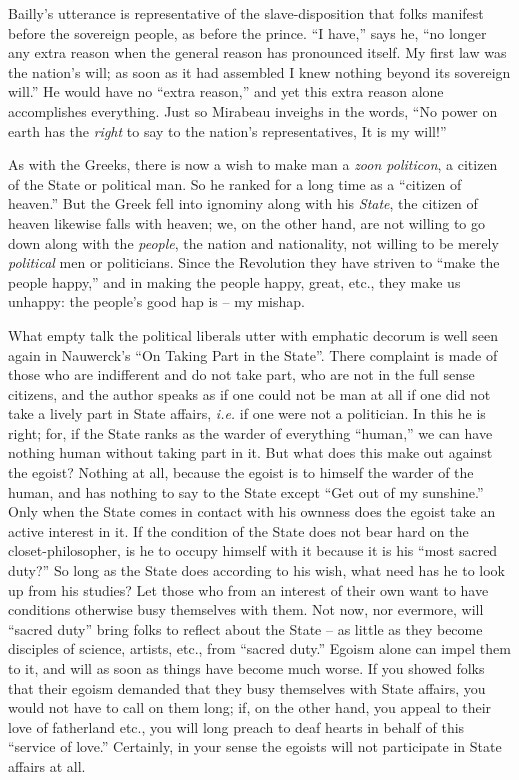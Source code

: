 Bailly's utterance is representative of the slave-disposition that folks 
manifest before the sovereign people, as before the prince. ``I have,'' says 
he, ``no longer any extra reason when the general reason has pronounced 
itself. My first law was the nation's will; as soon as it had assembled I knew 
nothing beyond its sovereign will.'' He would have no ``extra reason,'' and 
yet this extra reason alone accomplishes everything. Just so Mirabeau inveighs 
in the words, ``No power on earth has the \textit{right} to say to the 
nation's representatives, It is my will!''

As with the Greeks, there is now a wish to make man a \textit{zoon politicon}, 
a citizen of the State or political man. So he ranked for a long time as a 
``citizen of heaven.'' But the Greek fell into ignominy along with his 
\textit{State}, the citizen of heaven likewise falls with heaven; we, on the 
other hand, are not willing to go down along with the \textit{people}, the 
nation and nationality, not willing to be merely \textit{political} men or 
politicians. Since the Revolution they have striven to ``make the people 
happy,'' and in making the people happy, great, etc., they make us unhappy: 
the people's good hap is -- my mishap.

What empty talk the political liberals utter with emphatic decorum is well 
seen again in Nauwerck's ``On Taking Part in the State''. There complaint is 
made of those who are indifferent and do not take part, who are not in the 
full sense citizens, and the author speaks as if one could not be man at all 
if one did not take a lively part in State affairs, \textit{i.e.} if one were 
not a politician. In this he is right; for, if the State ranks as the warder 
of everything ``human,'' we can have nothing human without taking part in 
it. But what does this make out against the egoist? Nothing at all, because 
the egoist is to himself the warder of the human, and has nothing to say to 
the State except ``Get out of my sunshine.'' Only when the State comes in 
contact with his ownness does the egoist take an active interest in it. If the 
condition of the State does not bear hard on the closet-philosopher, is he to 
occupy himself with it because it is his ``most sacred duty?'' So long as 
the State does according to his wish, what need has he to look up from his 
studies? Let those who from an interest of their own want to have conditions 
otherwise busy themselves with them. Not now, nor evermore, will ``sacred 
duty'' bring folks to reflect about the State -- as little as they become 
disciples of science, artists, etc., from ``sacred duty.'' Egoism alone can 
impel them to it, and will as soon as things have become much worse. If you 
showed folks that their egoism demanded that they busy themselves with State 
affairs, you would not have to call on them long; if, on the other hand, you 
appeal to their love of fatherland etc., you will long preach to deaf hearts 
in behalf of this ``service of love.'' Certainly, in your sense the egoists 
will not participate in State affairs at all.

